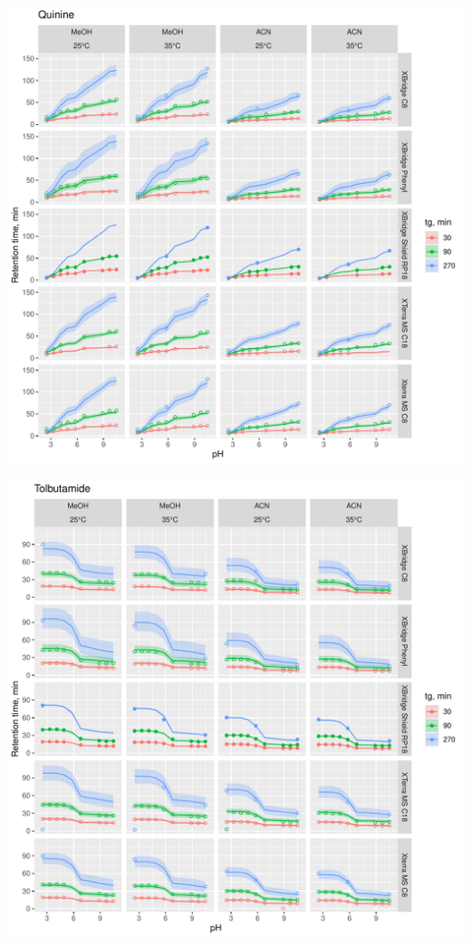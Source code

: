 \documentclass[
]{article}
\begin{document}
\newpage{}

\includegraphics{../figures/casestudy2/concordanceplots/Quinine.pdf}

\newpage{}

\includegraphics{../figures/casestudy2/concordanceplots/Tolbutamide.pdf}
\end{document}

